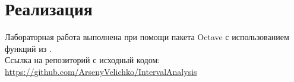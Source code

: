 \section{Реализация}
Лабораторная работа выполнена при помощи пакета Octave с использованием функций из \href{https://github.com/szhilin/octave-interval-examples}{\color{purple}{данного репозитория}}.\\
Ссылка на репозиторий с исходный кодом:\\
\url{https://github.com/ArsenyVelichko/IntervalAnalysis}